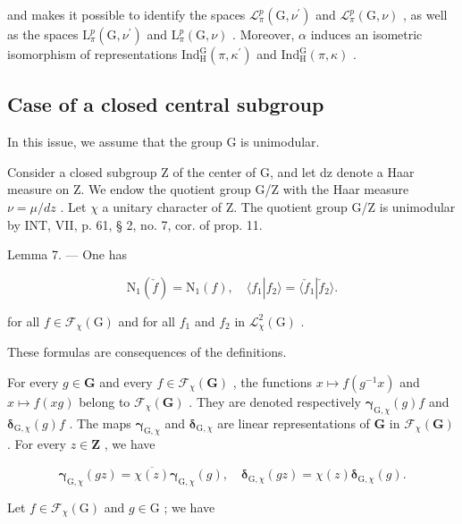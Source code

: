 and makes it possible to identify the spaces \(\mathcal{L}_{\pi}^{p}(\mathrm{G},\nu^{\prime})\) and \(\mathcal{L}_{\pi}^{p}(\mathrm{G},\nu)\) , as well as the spaces \(\mathrm{L}_{\pi}^{p}(\mathrm{G},\nu^{\prime})\) and \(\mathrm{L}_{\pi}^{p}(\mathrm{G},\nu)\) . Moreover, \(\alpha\) induces an isometric isomorphism of representations \(\mathrm{Ind}_{\mathrm{H}}^{\mathrm{G}}(\pi,\kappa^{\prime})\) and \(\mathrm{Ind}_{\mathrm{H}}^{\mathrm{G}}(\pi,\kappa)\) .

\subsection{Case of a closed central subgroup}

In this issue, we assume that the group G is unimodular.

 Consider a closed subgroup Z of the center of G, and let dz denote a Haar measure on Z. We endow the quotient group G/Z with the Haar measure \(\nu = \mu/dz\) . Let \(\chi\) a unitary character of Z. The quotient group G/Z is unimodular by INT, VII, p. 61, § 2, no. 7, cor. of prop. 11.

Lemma 7. --- One has

\[
\mathrm{N} _ {1} (\check {f}) = \mathrm{N} _ {1} (f), \quad \langle f _ {1} | f _ {2} \rangle = \langle \check {f} _ {1} | \check {f} _ {2} \rangle .\tag{6}
\]

for all \(f \in \mathcal{F}_{\chi}(\mathrm{G})\) and for all \(f_1\) and \(f_2\) in \(\mathcal{L}_{\chi}^{2}(\mathrm{G})\) .

These formulas are consequences of the definitions.

 For every \(g \in \mathbf{G}\) and every \(f \in \mathcal{F}_{\chi}(\mathbf{G})\) , the functions \(x \mapsto f(g^{-1}x)\) and \(x \mapsto f(xg)\) belong to \(\mathcal{F}_{\chi}(\mathbf{G})\) . They are denoted respectively \(\boldsymbol{\gamma}_{\mathrm{G},\chi}(g)f\) and \(\boldsymbol{\delta}_{\mathrm{G},\chi}(g)f\) . The maps \(\boldsymbol{\gamma}_{\mathrm{G},\chi}\) and \(\boldsymbol{\delta}_{\mathrm{G},\chi}\) are linear representations of \(\mathbf{G}\) in \(\mathcal{F}_{\chi}(\mathbf{G})\) . For every \(z \in \mathbf{Z}\) , we have

\[
\boldsymbol {\gamma} _ {\mathrm{G}, \chi} (g z) = \overline {{\chi (z)}} \boldsymbol {\gamma} _ {\mathrm{G}, \chi} (g), \quad \boldsymbol {\delta} _ {\mathrm{G}, \chi} (g z) = \chi (z) \boldsymbol {\delta} _ {\mathrm{G}, \chi} (g).\tag{7}
\]

Let \(f\in \mathcal{F}_{\chi}(\mathrm{G})\) and \(g\in \mathrm{G}\) ; we have

